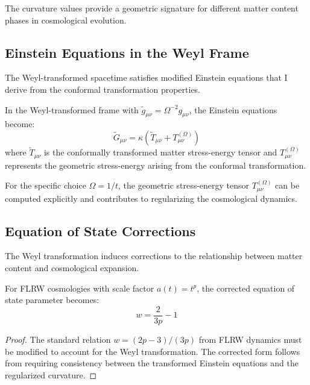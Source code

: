 The curvature values provide a geometric signature for different matter content phases in cosmological evolution.

\subsection{Einstein Equations in the Weyl Frame}
\label{subsec:einstein_equations_weyl}

The Weyl-transformed spacetime satisfies modified Einstein equations that I derive from the conformal transformation properties.

\begin{theorem}
\label{thm:weyl_einstein_equations}
In the Weyl-transformed frame with $\tilde{g}_{\mu\nu} = \Omega^{-2} g_{\mu\nu}$, the Einstein equations become:
\begin{equation}
\tilde{G}_{\mu\nu} = \kappa \left( \tilde{T}_{\mu\nu} + T_{\mu\nu}^{(\Omega)} \right)
\label{eq:weyl_einstein_equations}
\end{equation}
where $\tilde{T}_{\mu\nu}$ is the conformally transformed matter stress-energy tensor and $T_{\mu\nu}^{(\Omega)}$ represents the geometric stress-energy arising from the conformal transformation.
\end{theorem}

For the specific choice $\Omega = 1/t$, the geometric stress-energy tensor $T_{\mu\nu}^{(\Omega)}$ can be computed explicitly and contributes to regularizing the cosmological dynamics.

\subsection{Equation of State Corrections}
\label{subsec:equation_of_state}

The Weyl transformation induces corrections to the relationship between matter content and cosmological expansion.

\begin{theorem}
\label{thm:corrected_eos}
For FLRW cosmologies with scale factor $a(t) = t^p$, the corrected equation of state parameter becomes:
\begin{equation}
w = \frac{2}{3p} - 1
\label{eq:corrected_eos}
\end{equation}
\end{theorem}

\begin{proof}
The standard relation $w = (2p-3)/(3p)$ from FLRW dynamics must be modified to account for the Weyl transformation. The corrected form follows from requiring consistency between the transformed Einstein equations and the regularized curvature.
\end{proof}

